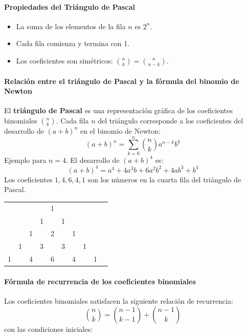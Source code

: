 \documentclass[12pt, a4paper]{article}
\theoremstyle{rioplatense}
\begin{document}
\paragraph{Propiedades del Triángulo de Pascal}
\begin{itemize}
    \item La suma de los elementos de la fila \(n\) es \(2^n\).
    \item Cada fila comienza y termina con 1.
    \item Los coeficientes son simétricos: \(\binom{n}{k} = \binom{n}{n-k}\).
\end{itemize}



\paragraph{Relación entre el triángulo de Pascal y la fórmula del binomio de Newton}
El \textbf{triángulo de Pascal} es una representación gráfica de los coeficientes binomiales $\binom{n}{k}$. Cada fila $n$ del triángulo corresponde a los coeficientes del desarrollo de $(a + b)^n$ en el binomio de Newton:
\begin{equation*}
(a + b)^n = \sum_{k=0}^{n} \binom{n}{k} a^{n-k} b^k
\end{equation*}
{Ejemplo para $n = 4$}.
%
El desarrollo de $(a + b)^4$ es:
%
\begin{equation*}
(a + b)^4 = a^4 + 4a^3b + 6a^2b^2 + 4ab^3 + b^4
\end{equation*}
%
Los coeficientes $1, 4, 6, 4, 1$ son los números en la cuarta fila del triángulo de Pascal.
%
\begin{center}
\begin{tabular}{cccccccccc}
&& & & 1 & & \\
&& & 1 & & 1 & \\
&& 1 & & 2 & & 1 \\
&1 & & 3 & & 3 & & 1 \\
1 && 4 & & 6 & & 4 && 1
\end{tabular}
\end{center}

\paragraph{Fórmula de recurrencia de los coeficientes binomiales}

Los coeficientes binomiales satisfacen la siguiente relación de recurrencia:
\begin{equation*}
\binom{n}{k} = \binom{n-1}{k-1} + \binom{n-1}{k}
\end{equation*}
con las condiciones iniciales:
\end{document}

